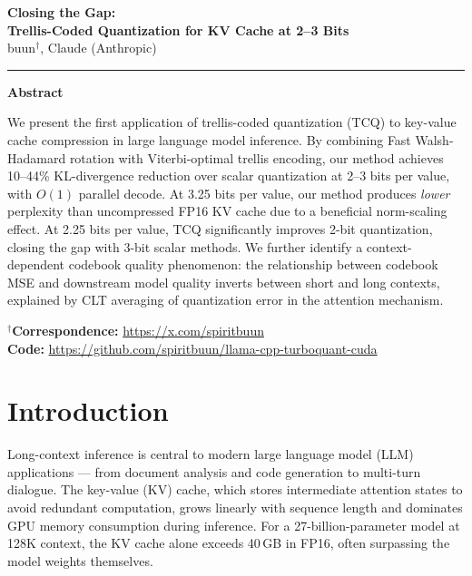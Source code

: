 \documentclass{article}
\begin{document}
\noindent
{\LARGE\bfseries Closing the Gap:}\\[4pt]
{\LARGE\bfseries Trellis-Coded Quantization for KV Cache at 2--3 Bits}\\[12pt]
{\large buun$^{\dagger}$, Claude (Anthropic)}\\[4pt]
\rule{\textwidth}{0.4pt}
\vspace{1.5em}

\begin{tcolorbox}[
  colback=themebg,
  colframe=themeborder,
  arc=4pt,
  boxrule=0.6pt,
  left=12pt, right=12pt, top=10pt, bottom=8pt,
  fontupper=\small
]
\centerline{\normalsize\bfseries\color{themecolor} Abstract}
\vspace{0.4em}

We present the first application of trellis-coded quantization (TCQ) to
key-value cache compression in large language model inference. By combining
Fast Walsh-Hadamard rotation with Viterbi-optimal trellis encoding, our method
achieves 10--44\% KL-divergence reduction over scalar quantization at 2--3 bits
per value, with $O(1)$ parallel decode. At 3.25 bits per value,
our method produces \emph{lower} perplexity than uncompressed FP16 KV cache
due to a beneficial norm-scaling effect. At 2.25 bits per value, TCQ
significantly improves 2-bit quantization, closing the gap with 3-bit scalar methods.
We further identify a context-dependent codebook quality phenomenon: the
relationship between codebook MSE and downstream model quality inverts between
short and long contexts, explained by CLT averaging of quantization error in the
attention mechanism.

\vspace{0.5em}
\footnotesize
$^{\dagger}$\textbf{Correspondence:} \url{https://x.com/spiritbuun}\\
\textbf{Code:} {\small\url{https://github.com/spiritbuun/llama-cpp-turboquant-cuda}}
\end{tcolorbox}

\section{Introduction}
\label{sec:intro}

Long-context inference is central to modern large language model (LLM)
applications — from document analysis and code generation to multi-turn
dialogue. The key-value (KV) cache, which stores intermediate attention states
to avoid redundant computation, grows linearly with sequence length and
dominates GPU memory consumption during inference. For a 27-billion-parameter
model at 128K context, the KV cache alone exceeds 40\,GB in FP16, often
surpassing the model weights themselves.
\end{document}
